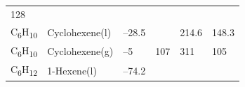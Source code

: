 \documentclass[
  9pt,
]{extbook}
\theoremstyle{definition}
\theoremstyle{definition}
\theoremstyle{definition}
\theoremstyle{remark}
\begin{document}
\begin{longtable}[]{@{}llllll@{}}
\begin{minipage}[t]{0.14\columnwidth}
128\strut
\end{minipage}\tabularnewline
\begin{minipage}[t]{0.07\columnwidth}\raggedright
C\textsubscript{6}H\textsubscript{10}\strut
\end{minipage} & \begin{minipage}[t]{0.17\columnwidth}\raggedright
Cyclohexene(l)\strut
\end{minipage} & \begin{minipage}[t]{0.15\columnwidth}\raggedright
--28.5\strut
\end{minipage} & \begin{minipage}[t]{0.15\columnwidth}\raggedright
\strut
\end{minipage} & \begin{minipage}[t]{0.14\columnwidth}\raggedright
214.6\strut
\end{minipage} & \begin{minipage}[t]{0.14\columnwidth}\raggedright
148.3\strut
\end{minipage}\tabularnewline
\begin{minipage}[t]{0.07\columnwidth}\raggedright
C\textsubscript{6}H\textsubscript{10}\strut
\end{minipage} & \begin{minipage}[t]{0.17\columnwidth}\raggedright
Cyclohexene(g)\strut
\end{minipage} & \begin{minipage}[t]{0.15\columnwidth}\raggedright
--5\strut
\end{minipage} & \begin{minipage}[t]{0.15\columnwidth}\raggedright
107\strut
\end{minipage} & \begin{minipage}[t]{0.14\columnwidth}\raggedright
311\strut
\end{minipage} & \begin{minipage}[t]{0.14\columnwidth}\raggedright
105\strut
\end{minipage}\tabularnewline
\begin{minipage}[t]{0.07\columnwidth}\raggedright
C\textsubscript{6}H\textsubscript{12}\strut
\end{minipage} & \begin{minipage}[t]{0.17\columnwidth}\raggedright
1-Hexene(l)\strut
\end{minipage} & \begin{minipage}[t]{0.15\columnwidth}\raggedright
--74.2\strut
\end{minipage} & \begin{minipage}[t]{0.15\columnwidth}\raggedright

\end{minipage}
\end{longtable}
\end{document}
